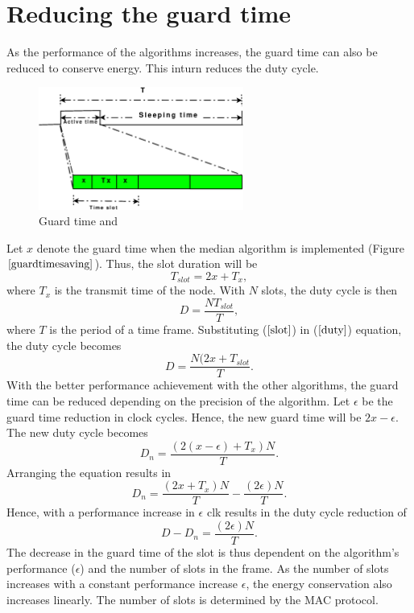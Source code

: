 \documentclass[a4paper,10pt]{report}
\begin{document}
\section{\textbf{Reducing the guard time}}
As the performance of the algorithms increases, the guard time can also be reduced to conserve energy. This inturn
reduces the duty cycle.
\begin{figure}
\centering
\includegraphics[width=0.6\textwidth]{guardtimesaving}
\caption{Guard time and } \label{guardtimesaving}
\end{figure}
\newline 
Let $x$ denote the guard time when the median algorithm is implemented (Figure $\ref{guardtimesaving}$). Thus, the slot
duration will be 
\begin{equation}
T_{slot}=2x + T_x ,
\label{slot}
\end{equation}
where $T_x$ is the transmit time of the node. 
\newline
With $N$ slots, the duty cycle is then
\begin{equation}
D = \frac{NT_{slot}}{T}, \label{duty}
\end{equation}
where $T$ is the period of a time frame. \newline Substituting ($\ref{slot}$) in ($\ref{duty}$) equation, the duty cycle becomes
\begin{equation}
D= \frac{N(2x+T_{slot}}{T}.
\end{equation}
With the better performance achievement with the other algorithms, the guard time can be reduced depending on the precision of the
algorithm. Let $\epsilon$ be the guard time reduction in clock cycles. Hence, the new guard time will be $2x-\epsilon$.
\newline The new duty cycle becomes 
\begin{equation}
D_n=\frac{(2(x-\epsilon)+T_x)N}{T}.
\end{equation}
Arranging the equation results in
\begin{equation}
D_n= \frac{(2x+T_x)N}{T} - \frac{(2\epsilon)N}{T}.
\end{equation}
Hence, with a performance increase in $\epsilon$ clk results in the duty cycle reduction of
\begin{equation}
D - D_n = \frac{(2\epsilon)N}{T}.
\end{equation}
The decrease in the guard time of the slot is thus dependent on the algorithm's performance ($\epsilon$) and the number of slots in the
frame. As the number of slots increases with a constant performance increase $\epsilon$, the energy conservation also increases linearly. The number of slots is determined by the MAC protocol.
\end{document}
